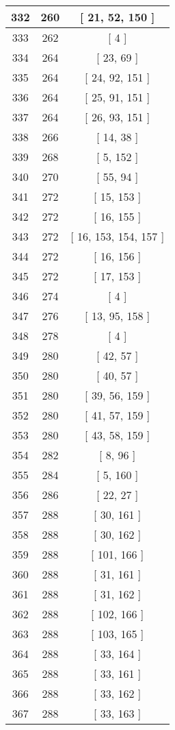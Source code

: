 \begin{center}
\begin{longtable}[H]{|| c c c ||}
332 & 260 & [ 21, 52, 150 ]
\\\hline
333 & 262 & [ 4 ]
\\\hline
334 & 264 & [ 23, 69 ]
\\\hline
335 & 264 & [ 24, 92, 151 ]
\\\hline
336 & 264 & [ 25, 91, 151 ]
\\\hline
337 & 264 & [ 26, 93, 151 ]
\\\hline
338 & 266 & [ 14, 38 ]
\\\hline
339 & 268 & [ 5, 152 ]
\\\hline
340 & 270 & [ 55, 94 ]
\\\hline
341 & 272 & [ 15, 153 ]
\\\hline
342 & 272 & [ 16, 155 ]
\\\hline
343 & 272 & [ 16, 153, 154, 157 ]
\\\hline
344 & 272 & [ 16, 156 ]
\\\hline
345 & 272 & [ 17, 153 ]
\\\hline
346 & 274 & [ 4 ]
\\\hline
347 & 276 & [ 13, 95, 158 ]
\\\hline
348 & 278 & [ 4 ]
\\\hline
349 & 280 & [ 42, 57 ]
\\\hline
350 & 280 & [ 40, 57 ]
\\\hline
351 & 280 & [ 39, 56, 159 ]
\\\hline
352 & 280 & [ 41, 57, 159 ]
\\\hline
353 & 280 & [ 43, 58, 159 ]
\\\hline
354 & 282 & [ 8, 96 ]
\\\hline
355 & 284 & [ 5, 160 ]
\\\hline
356 & 286 & [ 22, 27 ]
\\\hline
357 & 288 & [ 30, 161 ]
\\\hline
358 & 288 & [ 30, 162 ]
\\\hline
359 & 288 & [ 101, 166 ]
\\\hline
360 & 288 & [ 31, 161 ]
\\\hline
361 & 288 & [ 31, 162 ]
\\\hline
362 & 288 & [ 102, 166 ]
\\\hline
363 & 288 & [ 103, 165 ]
\\\hline
364 & 288 & [ 33, 164 ]
\\\hline
365 & 288 & [ 33, 161 ]
\\\hline
366 & 288 & [ 33, 162 ]
\\\hline
367 & 288 & [ 33, 163 ]
\\\hline

\end{longtable}
\end{center}

